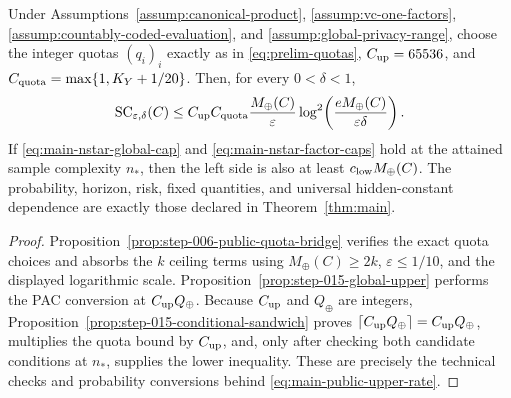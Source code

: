 \begin{corollary}
\label{cor:public-rate}
Under Assumptions~\ref{assump:canonical-product},
\ref{assump:vc-one-factors},
\ref{assump:countably-coded-evaluation}, and
\ref{assump:global-privacy-range}, choose the integer quotas
\((q_i)_i\) exactly as in \eqref{eq:prelim-quotas},
\(C_{\rm up}=65536\), and
\(C_{\rm quota}=\max\{1,K_Y+1/20\}\).  Then, for every
\(0<\delta<1\),
\begin{equation}\label{eq:main-public-upper-rate}
\operatorname{SC}_{\varepsilon,\delta}(C)
\le C_{\rm up}C_{\rm quota}
\frac{M_\oplus(C)}{\varepsilon}
\log^2\!\left(
\frac{eM_\oplus(C)}{\varepsilon\delta}
\right).
\end{equation}
If \eqref{eq:main-nstar-global-cap} and
\eqref{eq:main-nstar-factor-caps} hold at the attained sample
complexity \(n_*\), then the left side is also at least
\(c_{\rm low}M_\oplus(C)\).  The probability, horizon, risk, fixed
quantities, and universal hidden-constant dependence are exactly those
declared in Theorem~\ref{thm:main}.
\end{corollary}

\begin{proof}
Proposition~\ref{prop:step-006-public-quota-bridge} verifies the exact
quota choices and absorbs the \(k\) ceiling terms using
\(M_\oplus(C)\ge2k\), \(\varepsilon\le1/10\), and the displayed
logarithmic scale.  Proposition~\ref{prop:step-015-global-upper}
performs the PAC conversion at \(C_{\rm up}Q_\oplus\).
Because \(C_{\rm up}\) and \(Q_\oplus\) are integers,
Proposition~\ref{prop:step-015-conditional-sandwich} proves
\(\lceil C_{\rm up}Q_\oplus\rceil=C_{\rm up}Q_\oplus\), multiplies the
quota bound by \(C_{\rm up}\), and, only after checking both candidate
conditions at \(n_*\), supplies the lower inequality.  These are
precisely the technical checks and probability conversions behind
\eqref{eq:main-public-upper-rate}.
\end{proof}
